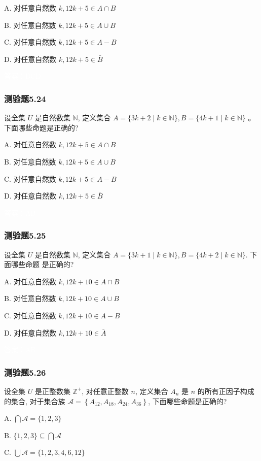 \documentclass[UTF8, heading=true]{ctexart}
\begin{document}
A. 对任意自然数 $k, 12 k+5 \in A \cap B$

B. 对任意自然数 $k, 12 k+5 \in A \cup B$

C. 对任意自然数 $k, 12 k+5 \in A-B$

D. 对任意自然数 $k, 12 k+5 \in \bar{B}$

\textcolor{white}{答案：BCD}

\subsubsection{测验题5.24}

设全集 $U$ 是自然数集 $\mathbb{N}$, 定义集合 $A=\{3 k+2 \mid k \in \mathbb{N}\}, B=\{4 k+1 \mid k \in \mathbb{N}\}$ 。下面哪些命题是正确的?

A. 对任意自然数 $k, 12 k+5 \in A \cap B$

B. 对任意自然数 $k, 12 k+5 \in A \cup B$

C. 对任意自然数 $k, 12 k+5 \in A-B$

D. 对任意自然数 $k, 12 k+5 \in \bar{B}$

\textcolor{white}{答案：AB}

\subsubsection{测验题5.25}
设全集 $U$ 是自然数集 $\mathbb{N}$, 定义集合 $A=\{3 k+1 \mid k \in \mathbb{N}\}, B=\{4 k+2 \mid k \in \mathbb{N}\}$. 下面哪些命题
是正确的?

A. 对任意自然数 $k, 12 k+10 \in A \cap B$

B. 对任意自然数 $k, 12 k+10 \in A \cup B$

C. 对任意自然数 $k, 12 k+10 \in A-B$

D. 对任意自然数 $k, 12 k+10 \in \bar{A}$

\textcolor{white}{答案：AB}

\subsubsection{测验题5.26}

设全集 $U$ 是正整数集 $\mathbb{Z}^{+}$, 对任意正整数 $n$, 定义集合 $A_n$ 是 $n$ 的所有正因子构成的集合, 对于集合族 $\mathcal{A}=\left\{A_{12}, A_{18}, A_{24}, A_{36}\right\}$, 下面哪些命题是正确的?

A. $\bigcap \mathcal{A}=\{1,2,3\}$

B. $\{1,2,3\} \subseteq \bigcap \mathcal{A}$

C. $\bigcup \mathcal{A}=\{1,2,3,4,6,12\}$
\end{document}
